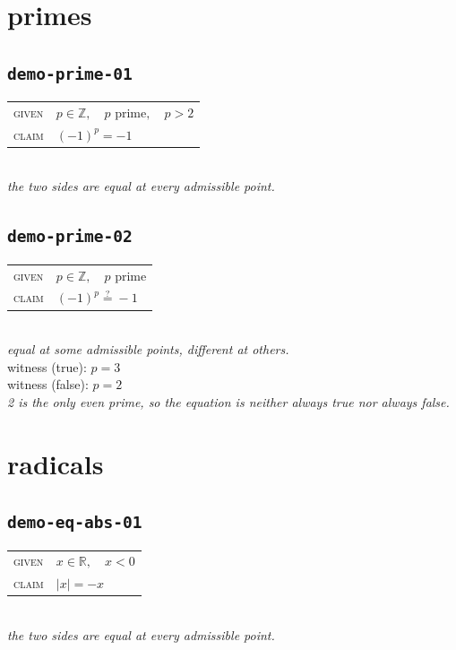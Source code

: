 \documentclass[11pt]{article}
\begin{document}
\section*{primes}
\subsection*{\texttt{demo-prime-01}}
\begin{tabular}{@{}l@{\quad}l@{}}
\textsc{given} & $p \in \mathbb{Z},\quad p \text{ prime},\quad p > 2$ \\[4pt]
\textsc{claim} & $\displaystyle \left(-1\right)^{p} = -1$ \\
\end{tabular}\\[2pt]
{\small\emph{the two sides are equal at every admissible point.}}\\

\subsection*{\texttt{demo-prime-02}}
\begin{tabular}{@{}l@{\quad}l@{}}
\textsc{given} & $p \in \mathbb{Z},\quad p \text{ prime}$ \\[4pt]
\textsc{claim} & $\displaystyle \left(-1\right)^{p} \overset{?}{=} -1$ \\
\end{tabular}\\[2pt]
{\small\emph{equal at some admissible points, different at others.}}\\
{\footnotesize\color{gray}witness (true): $p = 3$}\\
{\footnotesize\color{gray}witness (false): $p = 2$}\\
\emph{2 is the only even prime, so the equation is neither always true nor always false.}\\

\section*{radicals}
\subsection*{\texttt{demo-eq-abs-01}}
\begin{tabular}{@{}l@{\quad}l@{}}
\textsc{given} & $x \in \mathbb{R},\quad x < 0$ \\[4pt]
\textsc{claim} & $\displaystyle \left|x\right| = -x$ \\
\end{tabular}\\[2pt]
{\small\emph{the two sides are equal at every admissible point.}}\\
\end{document}
